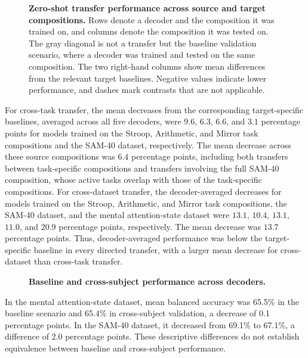 \documentclass[10pt,letterpaper]{article}
\begin{document}
\begin{figure}[H]
\centering
\caption{\textbf{Zero-shot transfer performance across source and target compositions.} Rows denote a decoder and the composition it was trained on, and columns denote the composition it was tested on. The gray diagonal is not a transfer but the baseline validation scenario, where a decoder was trained and tested on the same composition. The two right-hand columns show mean differences from the relevant target baselines. Negative values indicate lower performance, and dashes mark contrasts that are not applicable.}
\label{fig:transfer_matrix}
\end{figure}

For cross-task transfer, the mean decreases from the corresponding
target-specific baselines, averaged across all five decoders, were $9.6$,
$6.3$, $6.6$, and $3.1$ percentage points for models trained on the Stroop, Arithmetic, and
Mirror task compositions and the SAM-40 dataset, respectively. The mean
decrease across these source compositions was $6.4$ percentage points, including
both transfers between task-specific compositions and transfers involving the
full SAM-40 composition, whose active tasks overlap with those of the
task-specific compositions. For cross-dataset
transfer, the decoder-averaged decreases for models trained on the Stroop,
Arithmetic, and Mirror task compositions, the SAM-40 dataset, and the mental
attention-state dataset were $13.1$, $10.4$, $13.1$, $11.0$, and $20.9$ percentage points,
respectively. The mean decrease was $13.7$ percentage points. Thus,
decoder-averaged performance was below the target-specific baseline in every
directed transfer, with a larger mean decrease for cross-dataset than cross-task
transfer.

\begin{figure}[H]
\centering
\caption{\textbf{Baseline and cross-subject performance across decoders.}}
\label{fig:baseline_vs_cross_subject}
\end{figure}

In the mental attention-state dataset, mean balanced accuracy was 65.5\% in the
baseline scenario and 65.4\% in cross-subject validation, a decrease of 0.1
percentage points. In the SAM-40 dataset, it decreased from 69.1\% to 67.1\%,
a difference of 2.0 percentage points. These descriptive differences do not
establish equivalence between baseline and cross-subject performance.
\end{document}
